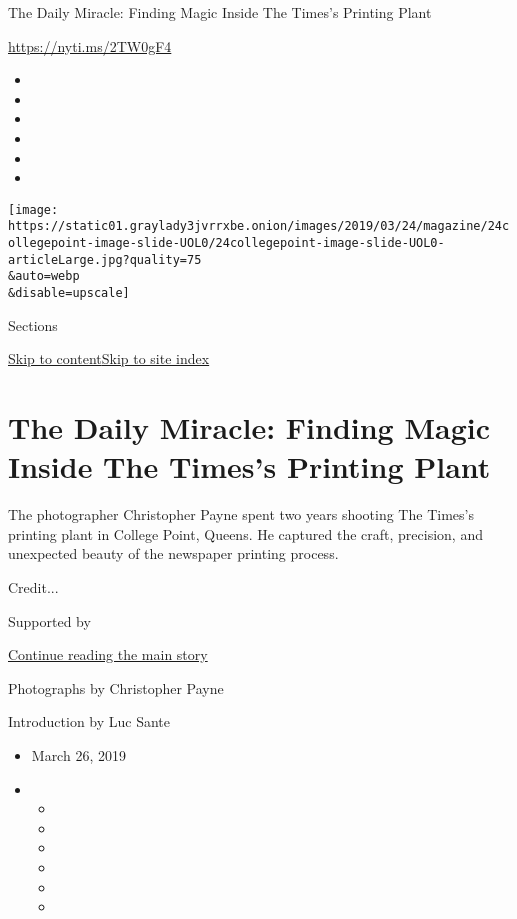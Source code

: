 The Daily Miracle: Finding Magic Inside The Times's Printing Plant

\url{https://nyti.ms/2TW0gF4}

\begin{itemize}
\item
\item
\item
\item
\item
\item
\end{itemize}

\texttt{[image: https://static01.graylady3jvrrxbe.onion/images/2019/03/24/magazine/24collegepoint-image-slide-UOL0/24collegepoint-image-slide-UOL0-articleLarge.jpg?quality=75\\\&auto=webp\\\&disable=upscale]}

Sections

\protect\hyperlink{site-content}{Skip to
content}\protect\hyperlink{site-index}{Skip to site index}

\hypertarget{the-daily-miracle-finding-magic-inside-the-timess-printing-plant}{%
\section{The Daily Miracle: Finding Magic Inside The Times's Printing
Plant}\label{the-daily-miracle-finding-magic-inside-the-timess-printing-plant}}

The photographer Christopher Payne spent two years shooting The Times's
printing plant in College Point, Queens. He captured the craft,
precision, and unexpected beauty of the newspaper printing process.

Credit...

Supported by

\protect\hyperlink{after-sponsor}{Continue reading the main story}

Photographs by Christopher Payne

Introduction by Luc Sante

\begin{itemize}
\item
  March 26, 2019
\item
  \begin{itemize}
  \item
  \item
  \item
  \item
  \item
  \item
  \end{itemize}
\end{itemize}

